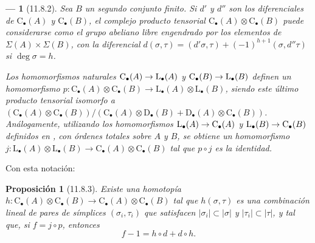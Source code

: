 \documentclass[10pt,oneside,openany]{book}
\theoremstyle{egaenv}\newtheorem*{env}{---}
\theoremstyle{egastatement}
\newtheorem*{proposition}{Proposición}
\theoremstyle{egadescription}
\newcommand{\oldpage}[2][]{\marginnote{\normalfont\scriptsize\textbf{#1}\,|\,#2}\ignorespaces}
\renewcommand{\to}{\mathchoice{\longrightarrow}{\rightarrow}{\rightarrow}{\rightarrow}}
\begin{document}
\begin{env}[11.8.2]
\label{0.11.8.2}
\label{0.11.8.2-fr}
Sea $B$ un segundo conjunto finito.
Si $d'$ y $d''$ son los diferenciales de
$\mathrm C_\bullet(A)$ y $\mathrm C_\bullet(B)$, el complejo producto
tensorial
$\mathrm C_\bullet(A)\otimes\mathrm C_\bullet(B)$
puede considerarse como el grupo abeliano libre engendrado por los elementos de
$\Sigma(A)\times\Sigma(B)$, con la diferencial $d(\sigma,\tau)=(d'\sigma,\tau)+(-1)^{h+1}(\sigma,d''\tau)$ si $\deg\sigma=h$.

Los homomorfismos naturales
$\mathrm C_\bullet(A)\to\mathrm L_\bullet(A)$ y
$\mathrm C_\bullet(B)\to\mathrm L_\bullet(B)$ definen un homomorfismo
$p:\mathrm C_\bullet(A)\otimes\mathrm C_\bullet(B)\longrightarrow\mathrm L_\bullet(A)\otimes\mathrm L_\bullet(B)$,
siendo este último producto tensorial isomorfo a
$(\mathrm C_\bullet(A)\otimes\mathrm C_\bullet(B))/(\mathrm C_\bullet(A)\otimes\mathrm D_\bullet(B)+\mathrm D_\bullet(A)\otimes\mathrm C_\bullet(B))$.
Análogamente, utilizando los homomorfismos
$\mathrm L_\bullet(A)\to\mathrm C_\bullet(A)$ y
$\mathrm L_\bullet(B)\to\mathrm C_\bullet(B)$ definidos en
, con órdenes totales sobre $A$ y $B$, se obtiene un
homomorfismo
$j:\mathrm L_\bullet(A)\otimes\mathrm L_\bullet(B)\longrightarrow\mathrm C_\bullet(A)\otimes\mathrm C_\bullet(B)$
tal que $p\circ j$ es la identidad.
\end{env}

\oldpage[0\textsubscript{III}]{44}
Con esta notación:
\begin{proposition}[11.8.3]
\label{0.11.8.3}
\label{0.11.8.3-fr}
Existe una homotopía
$h:\mathrm C_\bullet(A)\otimes\mathrm C_\bullet(B)\longrightarrow\mathrm C_\bullet(A)\otimes\mathrm C_\bullet(B)$
tal que $h(\sigma,\tau)$ es una combinación lineal de pares de símplices
$(\sigma_i,\tau_i)$ que satisfacen
$|\sigma_i|\subset|\sigma|$ y $|\tau_i|\subset|\tau|$, y tal que,
si $f=j\circ p$, entonces
\[
\label{0.11.8.3.1-fr}
\tag{11.8.3.1}
f-1=h\circ d+d\circ h.
\]
\end{proposition}
\end{document}
